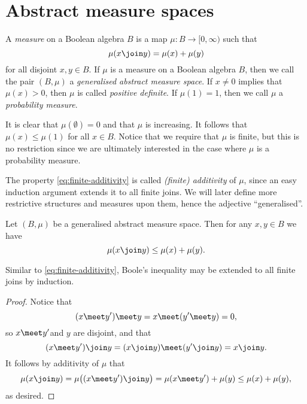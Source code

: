 \documentclass[article, a4paper, 11pt, oneside]{memoir}
\numberwithin{equation}{chapter}
\begin{document}
\section{Abstract measure spaces}

\begin{definition}
    A \emph{measure} on a Boolean algebra $B$ is a map $\mu \colon B \to [0,\infty)$ such that
    \begin{equation}
        \label{eq:finite-additivity}
        \mu(x \join y)
            = \mu(x) + \mu(y)
    \end{equation}
    for all disjoint $x,y \in B$. If $\mu$ is a measure on a Boolean algebra $B$, then we call the pair $(B,\mu)$ a \emph{generalised abstract measure space}. If $x \neq 0$ implies that $\mu(x) > 0$, then $\mu$ is called \emph{positive definite}. If $\mu(1) = 1$, then we call $\mu$ a \emph{probability measure}.
\end{definition}
%
It is clear that $\mu(\emptyset) = 0$ and that $\mu$ is increasing. It follows that $\mu(x) \leq \mu(1)$ for all $x \in B$. Notice that we require that $\mu$ is finite, but this is no restriction since we are ultimately interested in the case where $\mu$ is a probability measure. %

The property \cref{eq:finite-additivity} is called \emph{(finite) additivity} of $\mu$, since an easy induction argument extends it to all finite joins. We will later define more restrictive structures and measures upon them, hence the adjective \enquote{generalised}.

\begin{proposition}
    Let $(B,\mu)$ be a generalised abstract measure space. Then for any $x,y \in B$ we have
    \begin{equation*}
        \mu(x \join y)
            \leq \mu(x) + \mu(y).
    \end{equation*}
\end{proposition}
%
Similar to \cref{eq:finite-additivity}, Boole's inequality may be extended to all finite joins by induction.

\begin{proof}
    Notice that
    \begin{equation*}
        (x \meet y') \meet y = x \meet (y' \meet y) = 0,
    \end{equation*}
    so $x \meet y'$and $y$ are disjoint, and that
    \begin{equation*}
        (x \meet y') \join y = (x \join y) \meet (y' \join y) = x \join y.
    \end{equation*}
    It follows by additivity of $\mu$ that
    \begin{equation*}
        \mu(x \join y)
            = \mu \bigl( (x \meet y') \join y \bigr)
            = \mu(x \meet y') + \mu(y)
            \leq \mu(x) + \mu(y),
    \end{equation*}
    as desired.
\end{proof}
\end{document}
